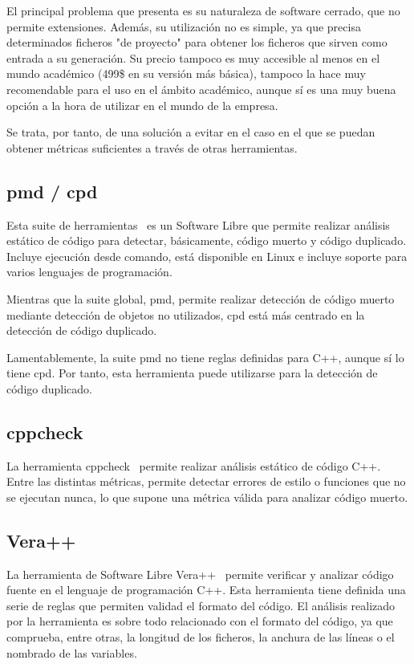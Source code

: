 \documentclass[11pt]{article}
\begin{document}
El principal problema que presenta es su naturaleza de software cerrado, que no permite extensiones. Además, su utilización no es simple, ya que precisa determinados ficheros "de proyecto" para obtener los ficheros que sirven como entrada a su generación. Su precio tampoco es muy accesible al menos en el mundo académico (499\$ en su versión más básica), tampoco la hace muy recomendable para el uso en el ámbito académico, aunque sí es una muy buena opción a la hora de utilizar en el mundo de la empresa.

Se trata, por tanto, de una solución a evitar en el caso en el que se puedan obtener métricas suficientes a través de otras herramientas.

\subsection{pmd / cpd}

Esta suite de herramientas~\cite{metrictools:pmdcpd} es un Software Libre que permite realizar análisis estático de código para detectar, básicamente, código muerto y código duplicado. Incluye ejecución desde comando, está disponible en Linux e incluye soporte para varios lenguajes de programación.

Mientras que la suite global, pmd, permite realizar detección de código muerto mediante detección de objetos no utilizados, cpd está más centrado en la detección de código duplicado.

Lamentablemente, la suite pmd no tiene reglas definidas para C++, aunque sí lo tiene cpd. Por tanto, esta herramienta puede utilizarse para la detección de código duplicado.

\subsection{cppcheck}

La herramienta cppcheck~\cite{metrictools:cppcheck} permite realizar análisis estático de código C++. Entre las distintas métricas, permite detectar errores de estilo o funciones que no se ejecutan nunca, lo que supone una métrica válida para analizar código muerto.

\subsection{Vera++}

La herramienta de Software Libre Vera++~\cite{metrictools:veraplusplus} permite verificar y analizar código fuente en el lenguaje de programación C++. Esta herramienta tiene definida una serie de reglas que permiten validad el formato del código. El análisis realizado por la herramienta es sobre todo relacionado con el formato del código, ya que comprueba, entre otras, la longitud de los ficheros, la anchura de las líneas o el nombrado de las variables.
\end{document}
